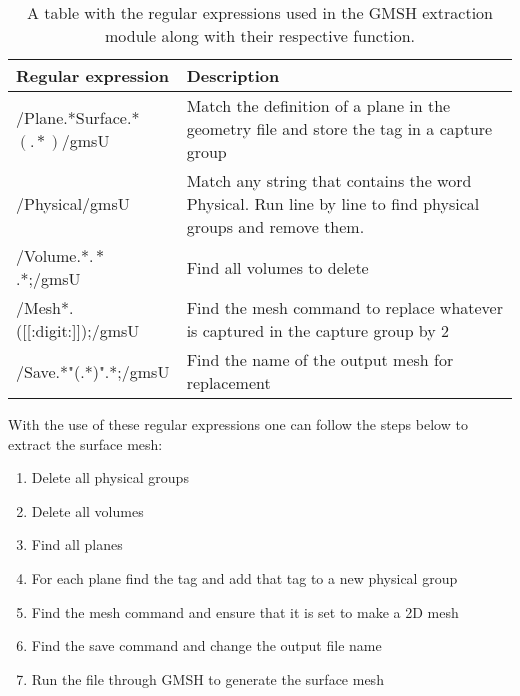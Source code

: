 \begin{table}[H]
    \begin{tabular}{p{5cm} p{9cm}}
    \hline
    \textbf{Regular expression}        & \textbf{Description}                                                                                        \\ \hline
    /Plane.*Surface.*\((.*)\)/gmsU     & Match the definition of a plane in the geometry file and store the tag in a capture group                   \\
    /Physical/gmsU                     & Match any string that contains the word Physical. Run line by line to find physical groups and remove them. \\
    /Volume.*\(.*\).*;/gmsU            & Find all volumes to delete                                                                                  \\
    /Mesh*.({[}{[}:digit:{]}{]});/gmsU & Find the mesh command to replace whatever is captured in the capture group by 2                             \\
    /Save.*"(.*)".*;/gmsU              & Find the name of the output mesh for replacement                                                            \\ \hline
    \end{tabular}
    \caption{A table with the regular expressions used in the GMSH extraction module along with their respective function.}
    \label{tab:REGEXgmshex}
\end{table}
With the use of these regular expressions one can follow the steps below to extract the surface mesh: 
\begin{enumerate}
    \item Delete all physical groups
    \item Delete all volumes
    \item Find all planes
    \item For each plane find the tag and add that tag to a new physical group
    \item Find the mesh command and ensure that it is set to make a 2D mesh
    \item Find the save command and change the output file name
    \item Run the file through GMSH to generate the surface mesh
\end{enumerate}

